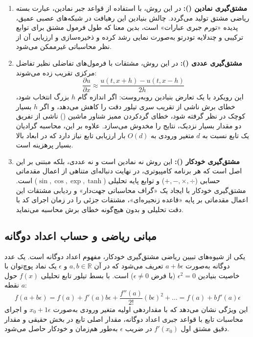 \begin{enumerate}
\item \textbf{مشتق‌گیری نمادین ():} در این روش، با استفاده از قواعد جبر نمادین، عبارت بسته ریاضی مشتق تولید می‌گردد. چالش بنیادین این رهیافت در شبکه‌های عصبی عمیق، پدیده «تورم جبری عبارات» است، بدین معنا که طول فرمول مشتق برای توابع ترکیبی و چندلایه تودرتو به‌صورت نمایی رشد کرده و ذخیره‌سازی و ارزیابی آن از نظر محاسباتی غیرممکن می‌شود.
\item \textbf{مشتق‌گیری عددی ():} در این روش، مشتقات با فرمول‌های تفاضلی نظیر تفاضل مرکزی تقریب زده می‌شوند:
\begin{equation}
\frac{\partial u}{\partial x} \approx \frac{u(t, x+h) - u(t, x-h)}{2h}
\end{equation}
این رویکرد با یک تعارض بنیادین روبه‌روست: اگر اندازه گام $h$ بزرگ انتخاب شود، خطای برش ناشی از تقریب سری تیلور دقت را کاهش می‌دهد، و اگر $h$ بسیار کوچک در نظر گرفته شود، خطای گردکردن ممیز شناور ماشین () ناشی از تفریق دو مقدار بسیار نزدیک، نتایج را مخدوش می‌سازد. علاوه بر این، محاسبه گرادیان یک تابع نسبت به $d$ متغیر ورودی به $O(d)$ بار ارزیابی تابع نیاز دارد که در ابعاد بالا بسیار پرهزینه است.
\item \textbf{مشتق‌گیری خودکار ():} این روش نه نمادین است و نه عددی، بلکه مبتنی بر این اصل است که هر برنامه کامپیوتری، در نهایت دنباله‌ای متناهی از اعمال مقدماتی حسابی ($+,-,\times,\div$) و توابع پایه تحلیلی ($\sin, \cos, \exp, \tanh$) است. مشتق‌گیری خودکار با ایجاد یک «گراف محاسباتی جهت‌دار» و ردیابی مشتقات این اعمال مقدماتی بر پایه «قاعده زنجیره‌ای»، مشتقات جزئی را در زمان اجرای کد با دقت تحلیلی و بدون هیچ‌گونه خطای برش محاسبه می‌نماید.
\end{enumerate}

\subsection{مبانی ریاضی و حساب اعداد دوگانه}
یکی از شیوه‌های تبیین ریاضی مشتق‌گیری خودکار، مفهوم اعداد دوگانه است. یک عدد دوگانه به‌صورت $a + b\epsilon$ تعریف می‌شود که در آن $a, b \in \mathbb{R}$ و $\epsilon$ یک نماد پوچ‌توان با خاصیت بنیادین $\epsilon^2 = 0$ (با فرض $\epsilon \ne 0$) است. با بسط تیلور تابع تحلیلی $f(x)$ حول نقطه $a$:
\begin{equation}
f(a + b\epsilon) = f(a) + f'(a) b\epsilon + \frac{f''(a)}{2!} (b\epsilon)^2 + \dots = f(a) + b f'(a)\epsilon
\end{equation}
این ویژگی نشان می‌دهد که با مقداردهی اولیه متغیر ورودی به‌صورت $x_0 + 1\epsilon$ و اجرای محاسبات تابع با قواعد جبری اعداد دوگانه، مقدار اصلی تابع در بخش حقیقی و مقدار دقیق مشتق اول $f'(x_0)$ در ضریب $\epsilon$ به‌طور هم‌زمان و خودکار حاصل می‌شود.

